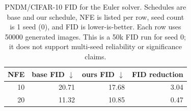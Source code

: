 \begin{table}[t]
  \centering
  \caption{PNDM/CIFAR-10 FID for the Euler solver. Schedules are
  base and our schedule, NFE is listed per row, seed count is 1 seed
  (0), and FID is lower-is-better. Each row uses 50000
  generated images. This is a 50k FID run for seed 0; it does not support multi-seed reliability or significance claims.}
  \label{tab:cifar10-pndm-euler-50k-fid-seed0}
  \begin{tabular}{rrrr}
    \toprule
    NFE & base FID $\downarrow$ & ours FID $\downarrow$ & FID reduction \\
    \midrule
    10 & 20.71 & 17.68 & 3.04 \\
    20 & 11.32 & 10.85 & 0.47 \\
    \bottomrule
  \end{tabular}
\end{table}
